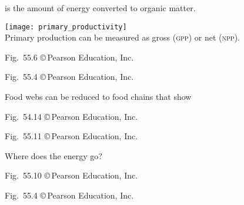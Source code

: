 \documentclass[t]{beamer}
\begin{document}
%
{
\begin{frame}[t]{ is the amount of energy converted to organic matter.}

	\vspace*{-0.5\baselineskip}
	
	\texttt{[image: primary\_productivity]}\\[\baselineskip]
	
	Primary production can be measured as gross (\textsc{gpp}) or net (\textsc{npp}).

	\vfilll
	
	\hfill \tiny Fig.~55.6 \copyright\,Pearson Education, Inc.
\end{frame}
}
%
{
\begin{frame}[b]

	\hfill \tiny Fig.~55.4 \copyright\,Pearson Education, Inc.

\end{frame}
}
%
{
\begin{frame}{}
\hspace{65mm}\begin{minipage}{0.45\textwidth}
	\flushleft
	\vspace{4\baselineskip}
	Food webs can be reduced to food chains that show 
\end{minipage}
\end{frame}
}
{
\begin{frame}[b]

	\hfill \tiny Fig.~54.14 \copyright\,Pearson Education, Inc.

\end{frame}
}
%
{
\begin{frame}[b]

	\hfill \tiny Fig.~55.11 \copyright\,Pearson Education, Inc.
\end{frame}
}
%
{
\begin{frame}[b]{Where does the energy go?}

	\hfill \tiny Fig.~55.10 \copyright\,Pearson Education, Inc.
\end{frame}
}
%
{
\begin{frame}[b]


	\hfill \tiny Fig.~55.4 \copyright\,Pearson Education, Inc.

\end{frame}
}
\end{document}

